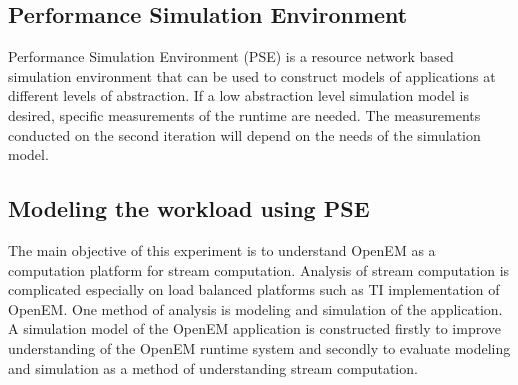 \subsection{Performance Simulation Environment}
Performance Simulation Environment (PSE) is a resource network based simulation environment that can be used to construct models of applications at different levels of abstraction. If a low abstraction level simulation model is desired, specific measurements of the runtime are needed. The measurements conducted on the second iteration will depend on the needs of the simulation model.
\subsection{Modeling the workload using PSE}
The main objective of this experiment is to understand OpenEM as a computation platform for stream computation. Analysis of stream computation is complicated especially on load balanced platforms such as TI implementation of OpenEM. One method of analysis is modeling and simulation of the application. A simulation model of the OpenEM application is constructed firstly to improve understanding of the OpenEM runtime system and secondly to evaluate modeling and simulation as a method of understanding stream computation.